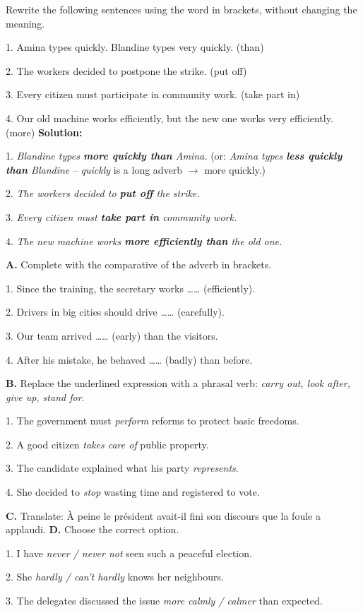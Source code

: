 \documentclass[11pt]{article}
\begin{document}
\begin{exoresolu}
Rewrite the following sentences using the word in brackets, without changing the meaning.\par
1. Amina types quickly. Blandine types very quickly. (than)\par
2. The workers decided to postpone the strike. (put off)\par
3. Every citizen must participate in community work. (take part in)\par
4. Our old machine works efficiently, but the new one works very efficiently. (more)
\tcblower
\textbf{Solution:}\par
1. \emph{Blandine types \textbf{more quickly than} Amina.} (or: \emph{Amina types \textbf{less quickly than} Blandine} -- \emph{quickly} is a long adverb $\rightarrow$ more quickly.)\par
2. \emph{The workers decided to \textbf{put off} the strike.}\par
3. \emph{Every citizen must \textbf{take part in} community work.}\par
4. \emph{The new machine works \textbf{more efficiently than} the old one.}
\end{exoresolu}

\begin{exercice}
\textbf{A.} Complete with the comparative of the adverb in brackets.\par
1. Since the training, the secretary works \dots\dots{} (efficiently).\par
2. Drivers in big cities should drive \dots\dots{} (carefully).\par
3. Our team arrived \dots\dots{} (early) than the visitors.\par
4. After his mistake, he behaved \dots\dots{} (badly) than before.\par
\textbf{B.} Replace the underlined expression with a phrasal verb: \emph{carry out, look after, give up, stand for}.\par
1. The government must \emph{perform} reforms to protect basic freedoms.\par
2. A good citizen \emph{takes care of} public property.\par
3. The candidate explained what his party \emph{represents}.\par
4. She decided to \emph{stop} wasting time and registered to vote.\par
\textbf{C.} Translate: \og \`A peine le pr\'esident avait-il fini son discours que la foule a applaudi. \fg{}
\textbf{D.} Choose the correct option.\par
1. I have \emph{never / never not} seen such a peaceful election.\par
2. She \emph{hardly / can't hardly} knows her neighbours.\par
3. The delegates discussed the issue \emph{more calmly / calmer} than expected.
\end{exercice}
\end{document}
